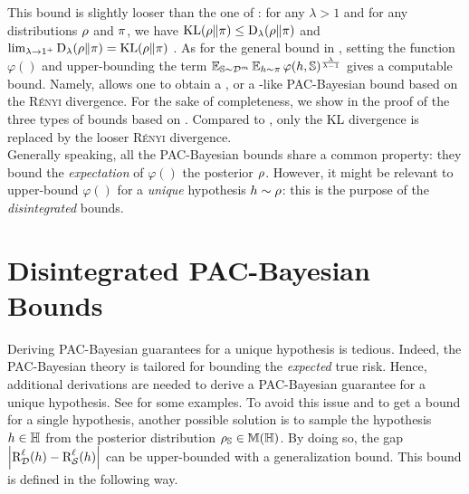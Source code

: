 This bound is slightly looser than the one of : for any $\lambda>1$ and for any distributions $\Q$ and $\P$, we have $\KL(\Q\|\P) \le \Renyi_{\lambda}(\Q\|\P)$ and $\lim_{\lambda\rightarrow 1^{+}}\Renyi_{\lambda}(\Q\|\P)=\KL(\Q\|\P)$ \citep{ErvenHarremoes2014}.
As for the general bound in , setting the function $\varphi()$ and upper-bounding the term $\EE_{\S{\sim}\D^{\m}}\EE_{\h{\sim}\P}\varphi(\h,\S)^\frac{\lambda}{\lambda{-}1}$ gives a computable bound.
Namely,  allows one to obtain a \citeauthor{McAllester2003}, \citeauthor{Catoni2007} or a \citeauthor{Seeger2002}-like PAC-Bayesian bound based on the \textsc{Rényi} divergence.
For the sake of completeness, we show in  the proof of the three types of bounds based on .
Compared to , only the KL divergence is replaced by the looser \textsc{Rényi} divergence.\\

Generally speaking, all the PAC-Bayesian bounds share a common property: they bound the {\it expectation} of $\varphi()$ \wrt the posterior $\Q$.
However, it might be relevant to upper-bound $\varphi()$ for a {\it unique} hypothesis $\h\sim\Q$: this is the purpose of the {\it disintegrated} bounds.

\section{Disintegrated PAC-Bayesian Bounds}
\label{chap:pac-bayes:sec:disintegrated}

Deriving PAC-Bayesian guarantees for a unique hypothesis is tedious.
Indeed, the PAC-Bayesian theory is tailored for bounding the {\it expected} true risk.
Hence, additional derivations are needed to derive a PAC-Bayesian guarantee for a unique hypothesis.
See \citet{Langford2005,LangfordShaweTaylor2002,GermainLacasseLavioletteMarchand2009} for some examples.
To avoid this issue and to get a bound for a single hypothesis, another possible solution is to sample the hypothesis $\h\in\H$ from the posterior distribution $\AQ \in \M(\H)$.
By doing so, the gap $\LN \RiskLoss_{\D}(\h)-\RiskLoss_{\dS}(\h)\RN$ can be upper-bounded with a generalization bound.
This bound is defined in the following way.

